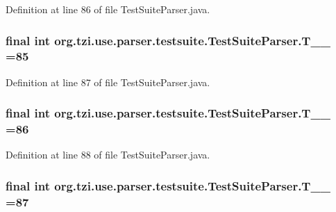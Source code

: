 Definition at line 86 of file Test\-Suite\-Parser.\-java.

\hypertarget{classorg_1_1tzi_1_1use_1_1parser_1_1testsuite_1_1_test_suite_parser_a82b152bad310cc4ca8baa5130f0c0b5f}{
\subsubsection[{T\-\_\-\-\_\-85}]{\setlength{\rightskip}{0pt plus 5cm}final int org.\-tzi.\-use.\-parser.\-testsuite.\-Test\-Suite\-Parser.\-T\-\_\-\-\_ =85\hspace{0.3cm}{\ttfamily [static]}}}\label{classorg_1_1tzi_1_1use_1_1parser_1_1testsuite_1_1_test_suite_parser_a82b152bad310cc4ca8baa5130f0c0b5f}


Definition at line 87 of file Test\-Suite\-Parser.\-java.

\hypertarget{classorg_1_1tzi_1_1use_1_1parser_1_1testsuite_1_1_test_suite_parser_a6f6e2d779a81131a968e5be441e3cede}{
\subsubsection[{T\-\_\-\-\_\-86}]{\setlength{\rightskip}{0pt plus 5cm}final int org.\-tzi.\-use.\-parser.\-testsuite.\-Test\-Suite\-Parser.\-T\-\_\-\-\_ =86\hspace{0.3cm}{\ttfamily [static]}}}\label{classorg_1_1tzi_1_1use_1_1parser_1_1testsuite_1_1_test_suite_parser_a6f6e2d779a81131a968e5be441e3cede}


Definition at line 88 of file Test\-Suite\-Parser.\-java.

\hypertarget{classorg_1_1tzi_1_1use_1_1parser_1_1testsuite_1_1_test_suite_parser_a2170aca256e90aeeddaf391cb0c61b37}{
\subsubsection[{T\-\_\-\-\_\-87}]{\setlength{\rightskip}{0pt plus 5cm}final int org.\-tzi.\-use.\-parser.\-testsuite.\-Test\-Suite\-Parser.\-T\-\_\-\-\_ =87\hspace{0.3cm}{\ttfamily [static]}}}\label{classorg_1_1tzi_1_1use_1_1parser_1_1testsuite_1_1_test_suite_parser_a2170aca256e90aeeddaf391cb0c61b37}


